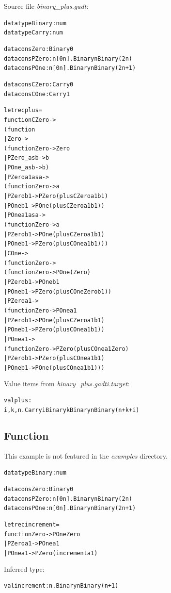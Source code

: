 \documentclass{article}
\newcommand{\tmem}[1]{{\em #1\/}}
\newcommand{\tmverbatim}[1]{{\ttfamily{#1}}}
\newenvironment{tmcode}[1][]{\begin{alltt}}{\end{alltt}}
\begin{document}
Source file {\tmem{binary\_plus.gadt}}:
\begin{tmcode}
datatype Binary : num
datatype Carry : num

datacons Zero : Binary 0
datacons PZero : n [0n]. Binary n  Binary(2 n)
datacons POne : n [0n]. Binary n  Binary(2 n + 1)

datacons CZero : Carry 0
datacons COne : Carry 1

let rec plus =
  function CZero ->
    (function
      | Zero ->
        (function Zero -> Zero
          | PZero _ as b -> b
          | POne _ as b -> b)
      | PZero a1 as a ->
        (function Zero -> a
          | PZero b1 -> PZero (plus CZero a1 b1)
          | POne b1 -> POne (plus CZero a1 b1))
      | POne a1 as a ->
        (function Zero -> a
          | PZero b1 -> POne (plus CZero a1 b1)
          | POne b1 -> PZero (plus COne a1 b1)))
    | COne ->
    (function Zero ->
        (function Zero -> POne(Zero)
          | PZero b1 -> POne b1
          | POne b1 -> PZero (plus COne Zero b1))
      | PZero a1 ->
        (function Zero -> POne a1
          | PZero b1 -> POne (plus CZero a1 b1)
          | POne b1 -> PZero (plus COne a1 b1))
      | POne a1 ->
        (function Zero -> PZero (plus COne a1 Zero)
          | PZero b1 -> PZero (plus COne a1 b1)
          | POne b1 -> POne (plus COne a1 b1)))
\end{tmcode}
Value items from {\tmem{binary\_plus.gadti.target}}:
\begin{tmcode}
val plus :
   i, k, n. Carry i  Binary k  Binary n  Binary (n + k + i)
\end{tmcode}

\subsection{Function \tmverbatim{increment}}

This example is not featured in the {\tmem{examples}} directory.
\begin{tmcode}
datatype Binary : num

datacons Zero : Binary 0
datacons PZero : n [0n]. Binary n  Binary(2 n)
datacons POne : n [0n]. Binary n  Binary(2 n + 1)

let rec increment =
  function Zero -> POne Zero
    | PZero a1 -> POne a1
    | POne a1 -> PZero (increment a1)
\end{tmcode}
Inferred type:
\begin{tmcode}
val increment : n. Binary n  Binary (n + 1)
\end{tmcode}
\end{document}

